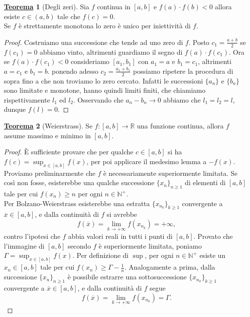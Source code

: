 \documentclass[a4paper,twoside]{article}
\newcommand{\N}{\mathbb{N}}
\newcommand{\R}{\mathbb{R}}
\theoremstyle{definition}
\newtheorem{theorem}{\color{Red}\underline{\textrm Teorema}}
\numberwithin{theorem}{section}
\begin{document}
\begin{theorem}[Degli zeri] Sia $f$ continua in $[a,b]$ e $f(a)\cdot f(b)<0$ allora esiste $c\in (a,b)$ tale che $f(c)=0$.\\ Se $f$ è strettamente monotona lo zero è unico per iniettività di $f$.
\end{theorem}
\begin{proof}
Costruiamo una successione che tende ad uno zero di $f$. Posto $c_1=\frac{a+b}{2}$ se $f(c_1)=0$ abbiamo vinto, altrimenti guardiamo il segno di $f(a)\cdot f(c_1)$. Ora se $f(a)\cdot f(c_1)<0$ consideriamo $[a_1,b_1]$ con $a_1=a$ e $b_1=c_1$, altrimenti $a=c_1$ e $b_1=b$. ponendo adesso $c_2=\frac{a_1+b_1}{2}$ possiamo ripetere la procedura di sopra fino a che non troviamo lo zero cercato. Infatti le successioni $\{a_n\}$ e $\{b_n\}$ sono limitate e monotone, hanno quindi limiti finiti, che chiamiamo rispettivamente $l_1$ ed $l_2$. 
Osservando che $a_n - b_n\to 0$ abbiamo che $l_1=l_2=l$, dunque $f(l)=0$.
\end{proof}


\begin{theorem}[Weierstrass]
Se $f:[a,b]\to \R$ una funzione continua, allora $f$ assume massimo e minimo in $[a,b]$.\end{theorem}
\begin{proof} È sufficiente provare che per qualche $c\in[a,b]$ si ha $f(c)=\sup_{x\in[a,b]}f(x)$, per poi applicare il medesimo lemma a $-f(x)$. Proviamo preliminarmente che $f$ è necessariamente superiormente limitata. Se così non fosse, esisterebbe una qualche successione $\{x_n\}_{n\geq 1}$ di elementi di $[a,b]$ tale per cui $f(x_n)\geq n$ per ogni $n\in\N^+$.\\ Per Bolzano-Weierstrass esisterebbe una estratta $\{x_{n_k}\}_{k\geq 1}$ convergente a $\overline{x}\in[a,b]$, e dalla continuità di $f$ si avrebbe 
$$f(\overline{x})=\lim_{k\to +\infty} f(x_{n_k}) = +\infty, $$
contro l'ipotesi che $f$ abbia valori reali in tutti i punti di $[a,b]$. Provato che l'immagine di $[a,b]$ secondo $f$ è superiormente limitata, poniamo $\Gamma=\sup_{x\in[a,b]}f(x)$. Per definizione di $\sup$, per ogni $n\in\N^+$ esiste un $x_n\in[a,b]$ tale per cui $f(x_n)\geq \Gamma-\frac{1}{n}$. Analogamente a prima, dalla successione $\{x_n\}_{n\geq 1}$ è possibile estrarre una sottosuccessione $\{x_{n_k}\}_{k\geq 1}$ convergente a $\overline{x}\in[a,b]$, e dalla continuità di $f$ segue 
$$ f(\overline{x})= \lim_{k\to +\infty} f(x_{n_k}) = \Gamma. $$
 
\end{proof}
\end{document}
